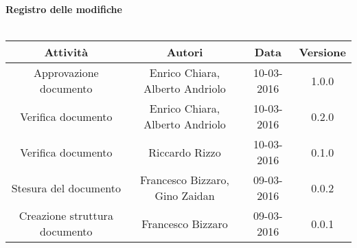 \vspace{1cm}
   {\fontsize{15pt}{16pt}\selectfont \textbf{Registro delle modifiche}}\\ \\

\bgroup
\def\arraystretch{1.6}
\begin{tabular}{| c | c | c | c |}
\hline
\textbf{Attività} & \textbf{Autori} & \textbf{Data} & \textbf{Versione}\\ \hline \hline


Approvazione documento & Enrico Chiara, Alberto Andriolo & 10-03-2016 & 1.0.0 
\\ 
\hline  

Verifica documento & Enrico Chiara, Alberto Andriolo & 10-03-2016 & 0.2.0 \\ 
\hline

Verifica documento & Riccardo Rizzo & 10-03-2016 & 0.1.0 \\ \hline

Stesura del documento & Francesco Bizzaro, Gino Zaidan & 09-03-2016 & 0.0.2 \\ 
\hline

Creazione struttura documento & Francesco Bizzaro & 09-03-2016 & 0.0.1 \\ 
\hline



\end{tabular}
\egroup
\newpage